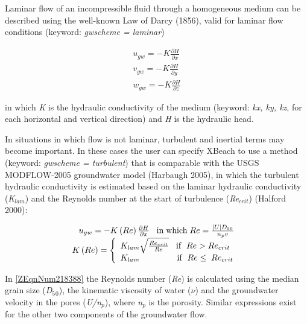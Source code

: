 \documentclass{article}
\begin{document}
\noindent Laminar flow of an incompressible fluid through a homogeneous medium can be described using the well-known Law of Darcy (1856), valid for laminar flow conditions (keyword: \textit{gwscheme = laminar})

\noindent 
\begin{equation} \label{ZEqnNum953353} 
\begin{array}{c} {u_{gw} =-K\frac{\partial H}{\partial x} } \\ {v_{gw} =-K\frac{\partial H}{\partial y} } \\ {w_{gw} =-K\frac{\partial H}{\partial z} } \end{array} 
\end{equation} 


\noindent in which \textit{K} is the hydraulic conductivity of the medium (keyword: \textit{kx, ky, kz}, for each horizontal and vertical direction) and \textit{H} is the hydraulic head.

\noindent 

\noindent In situations in which flow is not laminar, turbulent and inertial terms may become important. In these cases the user can specify XBeach to use a method (keyword: \textit{gwscheme = turbulent}) that is comparable with the USGS MODFLOW-2005 groundwater model (Harbaugh 2005), in which the turbulent hydraulic conductivity is estimated based on the laminar hydraulic conductivity (\textit{K${}_{lam}$}) and the Reynolds number at the start of turbulence (\textit{Re${}_{crit}$}) (Halford 2000):

\noindent 
\begin{equation} \label{ZEqnNum218388} 
\begin{array}{c} {u_{gw} =-K\left(Re\right)\frac{\partial H}{\partial x} {\rm \; \; \; in\; which\; }Re=\frac{\left|U\right|D_{50} }{n_{p} v} } \\ {K\left(Re\right)=\left\{\begin{array}{l} {K_{lam} \sqrt{\frac{Re_{crit} }{Re} } {\rm \; \; \; if\; \; }Re{\rm \; >\; }Re_{crit} {\rm \; }} \\ {K_{lam} {\rm \; \; \; \; \; \; \; \; \; \; \; \; \; \; \; \; if\; \; }Re\le {\rm \; }Re_{crit} {\rm \; }} \end{array}\right. } \end{array} 
\end{equation} 


\noindent In \eqref{ZEqnNum218388} the Reynolds number (\textit{Re}) is calculated using the median grain size (\textit{D${}_{5}$}${}_{0}$), the kinematic viscosity of water (\textit{$\nu $}) and the groundwater velocity in the pores (\textit{U/n${}_{p}$}), where \textit{n${}_{p}$} is the porosity. Similar expressions exist for the other two components of the groundwater flow. 
\end{document}
